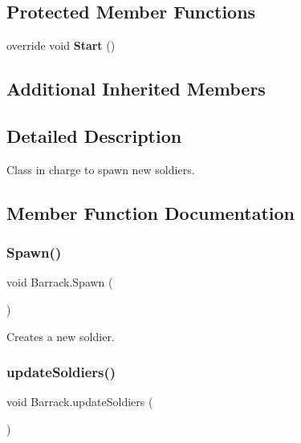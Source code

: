 \subsection*{Protected Member Functions}
\begin{DoxyCompactItemize}
\item 
\mbox{\label{class_barrack_ab230d4125f840eb86bf4ab21439f7acd}} 
override void {\bfseries Start} ()
\end{DoxyCompactItemize}
\subsection*{Additional Inherited Members}


\subsection{Detailed Description}
Class in charge to spawn new soldiers. 



\subsection{Member Function Documentation}
\mbox{\label{class_barrack_ac0496855ca1e379fc38fbb882b71c018}} 
\subsubsection{\texorpdfstring{Spawn()}{Spawn()}}
{\footnotesize\ttfamily void Barrack.\+Spawn (\begin{DoxyParamCaption}{ }\end{DoxyParamCaption})}



Creates a new soldier. 

\mbox{\label{class_barrack_ae71023bf7da489b81791d7e1582ba154}} 
\subsubsection{\texorpdfstring{update\+Soldiers()}{updateSoldiers()}}
{\footnotesize\ttfamily void Barrack.\+update\+Soldiers (\begin{DoxyParamCaption}{ }\end{DoxyParamCaption})}



